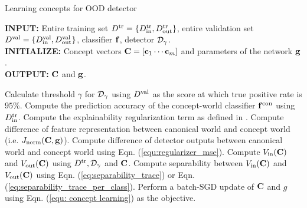 \begin{algorithm}[ht]
\caption{Learning concepts for OOD detector}
\label{alg:concept_learning}
\textbf{INPUT:} Entire training set $D^{\textrm{tr}} = \{D_{\textrm{in}}^{\textrm{tr}}, D_{\textrm{out}}^{\textrm{tr}}\}$, entire validation set $D^{\textrm{val}} = \{D_{\textrm{in}}^{\textrm{val}}, D_{\textrm{out}}^{\textrm{val}}\}$, classifier $\mathbf{f}$, detector $\mathcal{D}_\gamma$. \\
\textbf{INITIALIZE:} Concept vectors $\mathbf{C} = [\mathbf{c}_1 \cdots \mathbf{c}_m]$ and parameters of the network $\mathbf{g}$. \\
\textbf{OUTPUT:} $\mathbf{C}$ and $\mathbf{g}$.
\begin{algorithmic}[1]
  \STATE Calculate threshold $\gamma$ for $\mathcal{D}_\gamma$ using $D^{\textrm{val}}$ as the score at which true positive rate is $95\%$.
    \STATE Compute the prediction accuracy of the concept-world classifier $\mathbf{f}^{\textrm{con}}$ using $D_{\textrm{in}}^{\textrm{tr}}$.
    \STATE Compute the explainability regularization term as defined in \cite{yeh2020completeness}.
	\STATE Compute difference of feature representation between canonical world and concept world (i.e. $J_{\textrm{norm}}(\mathbf{C}, \mathbf{g})$).
	\STATE Compute difference of detector outputs between canonical world and concept world using Eqn. (\ref{equ:regularizer_mse}).
	\STATE Compute $V_{\textrm{in}}(\mathbf{C})$ and $V_{\textrm{out}}(\mathbf{C})$ using $D^{\textrm{tr}}, \mathcal{D}_\gamma$ and $\mathbf{C}$.
	\STATE Compute separability between $V_{\textrm{in}}(\mathbf{C})$ and $V_{\textrm{out}}(\mathbf{C})$ using Eqn. (\ref{eq:separability_trace}) or Eqn. (\ref{eq:separability_trace_per_class}).
    \STATE Perform a batch-SGD update of $\mathbf{C}$ and $g$ using Eqn. (\ref{equ: concept learning}) as the objective.
  \ENDFOR
\end{algorithmic} 
\end{algorithm}


